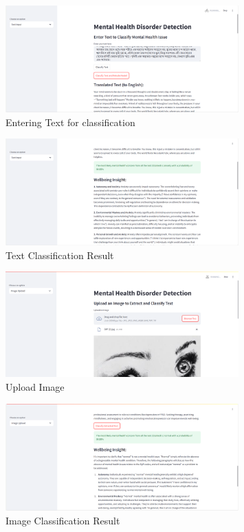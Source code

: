\begin{figure}[h!]  
    \centering
    \includegraphics[width=0.8\textwidth]{App Images/02 Interface.png}  
    \caption{Entering Text for classification}
    \label{02i}  %
\end{figure}

\begin{figure}[h!]  
    \centering
    \includegraphics[width=0.8\textwidth]{App Images/03 Interface.png}  
    \caption{Text Classification Result}
    \label{03i}  %
\end{figure}



\begin{figure}[h!]  
    \centering
    \includegraphics[width=0.8\textwidth]{App Images/04 Interface.png}  
    \caption{Upload Image}
    \label{04i}  %
\end{figure}

\begin{figure}[h!]  
    \centering
    \includegraphics[width=0.8\textwidth]{App Images/05 Interface.png}  
    \caption{Image Classification Result}
    \label{05i}  %
\end{figure}


